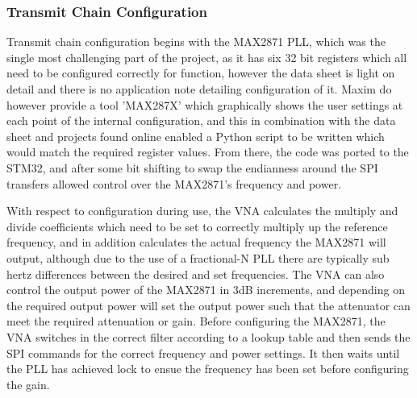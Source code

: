 \subsubsection{Transmit Chain Configuration}
Transmit chain configuration begins with the MAX2871 PLL, which was the single most challenging part of the project, as it has six 32 bit registers which all need to be configured correctly for function, however the data sheet is light on detail and there is no application note detailing configuration of it. Maxim do however provide a tool 'MAX287X' which graphically shows the user settings at each point of the internal configuration, and this in combination with the data sheet and projects found online \cite{max2871_trans} \cite{max2871_synth} enabled a Python script to be written which would match the required register values. From there, the code was ported to the STM32, and after some bit shifting to swap the endianness around the SPI transfers allowed control over the MAX2871's frequency and power. 

With respect to configuration during use, the VNA calculates the multiply and divide coefficients which need to be set to correctly multiply up the reference frequency, and in addition calculates the actual frequency the MAX2871 will output, although due to the use of a fractional-N PLL there are typically sub hertz differences between the desired and set frequencies. The VNA can also control the output power of the MAX2871 in 3dB increments, and depending on the required output power will set the output power such that the attenuator can meet the required attenuation or gain. Before configuring the MAX2871, the VNA switches in the correct filter according to a lookup table and then sends the SPI commands for the correct frequency and power settings. It then waits until the PLL has achieved lock to ensue the frequency has been set before configuring the gain. 

